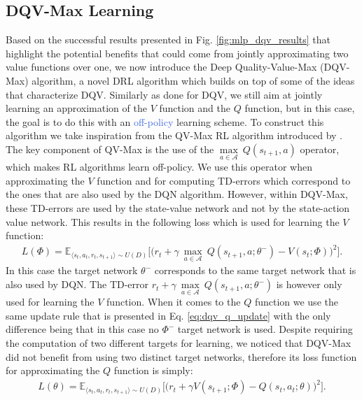 \subsection{DQV-Max Learning}
Based on the successful results presented in Fig. \ref{fig:mlp_dqv_results} that highlight the potential benefits that could come from jointly approximating two value functions over one, we now introduce the Deep Quality-Value-Max (DQV-Max) algorithm, a novel DRL algorithm which builds on top of some of the ideas that characterize DQV. Similarly as done for DQV, we still aim at jointly learning an approximation of the $V$ function and the $Q$ function, but in this case, the goal is to do this with an \textcolor{RoyalBlue}{off-policy} learning scheme. To construct this algorithm we take inspiration from the QV-Max RL algorithm introduced by \citet{wiering2009qv}. The key component of QV-Max is the use of the $\underset{a\in \mathcal{A}}{\max}\: Q(s_{t+1}, a)$ operator, which makes RL algorithms learn off-policy. We use this operator when approximating the $V$ function and for computing TD-errors which correspond to the ones that are also used by the DQN algorithm. However, within DQV-Max, these TD-errors are used by the state-value network and not by the state-action value network. This results in the following loss which is used for learning the $V$ function:
\begin{multline}
L(\Phi) = \mathds{E}_{\langle s_{t},a_{t},r_{t},s_{t+1}\rangle\sim U(D)} \bigg[\big(r_{t} + \gamma \: \underset{a\in \mathcal{A}}{\max}\: Q(s_{t+1}, a; \theta^{-}) - V(s_{t}; \Phi)\big)^{2}\bigg].
\label{eq:dqv_max_v}
\end{multline}
In this case the target network $\theta^{-}$ corresponds to the same target network that is also used by DQN. The TD-error $r_{t} + \gamma \: \underset{a\in \mathcal{A}}{\max}\: Q(s_{t+1}, a; \theta^{-})$ is however only used for learning the $V$ function. When it comes to the $Q$ function we use the same update rule that is presented in Eq. \ref{eq:dqv_q_update} with the only difference being that in this case no $\Phi^{-}$ target network is used. Despite requiring the computation of two different targets for learning, we noticed that DQV-Max did not benefit from using two distinct target networks, therefore its loss function for approximating the $Q$ function is simply:
\begin{multline}
    L(\theta) = \mathds{E}_{\langle s_{t},a_{t},r_{t},s_{t+1}\rangle\sim U(D)} \bigg[\big(r_{t} + \gamma V(s_{t+1}; \Phi) - Q(s_{t}, a_{t}; \theta)\big)^{2}\bigg].
    \label{eq:dqv_max_q}
\end{multline}

